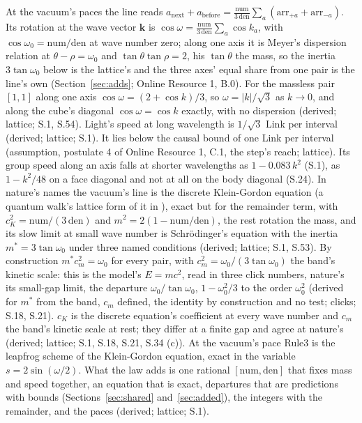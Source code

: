 \documentclass[pdflatex,sn-mathphys-num]{sn-jnl}
\newcommand{\num}{\mathrm{num}}
\newcommand{\den}{\mathrm{den}}
\newcommand{\abefore}{a_{\mathrm{before}}}
\newcommand{\anext}{a_{\mathrm{next}}}
\theoremstyle{thmstyleone}
\theoremstyle{thmstyletwo}
\begin{document}
At the vacuum's paces the line reads $\anext + \abefore = \frac{\num}{3\,\den}\sum_a (\mathrm{arr}_{+a} + \mathrm{arr}_{-a})$. Its rotation at the wave vector $\mathbf k$ is $\cos\omega = \frac{\num}{3\,\den}\sum_a \cos k_a$, with $\cos\omega_0 = \num / \den$ at wave number zero; along one axis it is Meyer's dispersion relation \cite{meyer1997} at $\theta - \rho = \omega_0$ and $\tan\theta\tan\rho = 2$, his $\tan\theta$ the mass, so the inertia $3\tan\omega_0$ below is the lattice's and the three axes' equal share from one pair is the line's own (Section~\ref{sec:adds}; Online Resource 1, B.0). For the massless pair $[1, 1]$ along one axis $\cos\omega = (2 + \cos k) / 3$, so $\omega = |k| / \sqrt 3$ as $k \to 0$, and along the cube's diagonal $\cos\omega = \cos k$ exactly, with no dispersion (derived; lattice; S.1, S.54). Light's speed at long wavelength is $1 / \sqrt 3$ Link per interval (derived; lattice; S.1). It lies below the causal bound of one Link per interval (assumption, postulate 4 of Online Resource 1, C.1, the step's reach; lattice). Its group speed along an axis falls at shorter wavelengths as $1 - 0.083\,k^2$ (S.1), as $1 - k^2 / 48$ on a face diagonal and not at all on the body diagonal (S.24). In nature's names the vacuum's line is the discrete Klein-Gordon equation (a quantum walk's lattice form of it in \cite{arrighi2013}), exact but for the remainder term, with $c_K^2 = \num / (3\,\den)$ and $m^2 = 2(1 - \num / \den)$, the rest rotation the mass, and its slow limit at small wave number is Schr\"odinger's equation with the inertia $m^* = 3\tan\omega_0$ under three named conditions (derived; lattice; S.1, S.53). By construction $m^* c_m^2 = \omega_0$ for every pair, with $c_m^2 = \omega_0 / (3\tan\omega_0)$ the band's kinetic scale: this is the model's $E = mc^2$, read in three click numbers, nature's its small-gap limit, the departure $\omega_0 / \tan\omega_0$, $1 - \omega_0^2 / 3$ to the order $\omega_0^2$ (derived for $m^*$ from the band, $c_m$ defined, the identity by construction and no test; clicks; S.18, S.21). $c_K$ is the discrete equation's coefficient at every wave number and $c_m$ the band's kinetic scale at rest; they differ at a finite gap and agree at nature's (derived; lattice; S.1, S.18, S.21, S.34 (c)). At the vacuum's pace Rule3 is the leapfrog scheme of the Klein-Gordon equation, exact in the variable $s = 2\sin(\omega / 2)$. What the law adds is one rational $[\num, \den]$ that fixes mass and speed together, an equation that is exact, departures that are predictions with bounds (Sections~\ref{sec:shared} and~\ref{sec:added}), the integers with the remainder, and the paces (derived; lattice; S.1).
\end{document}
